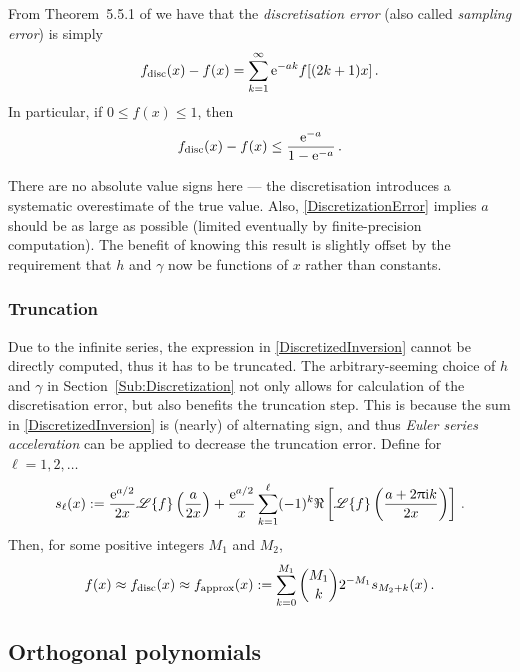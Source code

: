 From Theorem~5.5.1 of \cite{RoScScTe08} we have that the \emph{discretisation error} (also called \emph{sampling error}) is simply
\begin{equation} \label{DiscretizationError}
    f_{\mathrm{disc}}(x) - f(x) = \sum_{k=1}^\infty \mathrm{e}^{-a k} f[ (2k+1) x ] \,.
\end{equation}
In particular, if $0 \le f(x) \le 1$, then
\begin{equation} \label{BoundedDiscretizationError}
    f_{\mathrm{disc}}(x) - f(x) \le \frac{\mathrm{e}^{-a}}{1-\mathrm{e}^{-a}} \,.
\end{equation}

There are no absolute value signs here --- the discretisation introduces a systematic overestimate of the true value.
Also, \eqref{DiscretizationError} implies $a$ should be as large as possible (limited eventually by finite-precision computation).
The benefit of knowing this result is slightly offset by the requirement that $h$ and $\gamma$ now be functions of $x$ rather than constants.

\subsubsection{Truncation}

Due to the infinite series, the expression in \eqref{DiscretizedInversion} cannot be directly computed, thus it has to be truncated.
The arbitrary-seeming choice of $h$ and $\gamma$ in Section~\ref{Sub:Discretization} not only allows for calculation of the discretisation error, but also benefits the truncation step. This is because the sum in \eqref{DiscretizedInversion} is (nearly) of alternating sign, and thus \emph{Euler series acceleration} can be applied to decrease the truncation error. Define for $\ell=1,2,\dots$
\begin{equation*} \label{TruncatedInversion}
s_\ell(x) := \frac{\mathrm{e}^{a/2}}{2x}\mathscr{L}\{f\} \left(\frac{a}{2 x}\right) + \frac{\mathrm{e}^{a/2}}{x} \sum_{k=1}^\ell (-1)^{k} \Re\left[\mathscr{L}\{f\}\left(\frac{a+ 2\uppi \mathrm{i} k}{2 x}\right)\right] \,.
\end{equation*}
Then, for some positive integers $M_1$ and $M_2$,
\begin{equation}\label{eq:FinalApproxLaplaceInversion}
f(x) \approx f_{\mathrm{disc}}(x) \approx f_{\mathrm{approx}}(x) := \sum_{k=0}^{M_1} \binom{M_1}{k} 2^{-M_1} s_{M_2+k}(x) \,.
\end{equation}

\subsection{Orthogonal polynomials} \label{subsc:ortho_poly}

